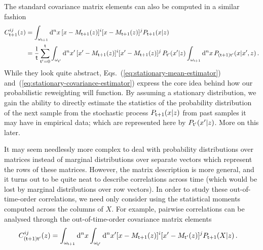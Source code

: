 The standard covariance matrix elements can also be computed in a similar fashion
\begin{align}
C^{ij}_{{\sf t}+1}(z) &= \int_{\omega_{{\sf t}+1}}{\rm d}^nx \,[x-M_{{\sf t}+1}(z)
]^i[x-M_{{\sf t}+1}(z)]^jP_{{\sf t}+1}(x\vert z) \nonumber \\
&= \frac{1}{{\sf t}}\sum_{{\sf t}'=0}^{{\sf t}}\int_{\omega_{{\sf t}'}}{\rm d}^nx' \, [x'-M_{{\sf t}+1}(z)]^i[x'-M_{{\sf t}+1}(z)]^j \,P_{{\sf t}'}(x'\vert z) \int_{\omega_{{\sf t}+1}}{\rm d}^nx \, P_{({\sf t}+1){\sf t}'}(x\vert x',z) \label{eq:stationary-covariance-estimator}\,.
\end{align}
While they look quite abstract, Eqs.~(\ref{eq:stationary-mean-estimator}) and~(\ref{eq:stationary-covariance-estimator}) express the core idea behind how our probabilistic reweighting will function. By assuming a stationary distribution, we gain the ability to directly estimate the statistics of the probability distribution of the next sample from the stochastic process $P_{{\sf t}+1}(x\vert z)$ from past samples it may have in empirical data; which are represented here by $P_{{\sf t}'}(x'\vert z)$. More on this later.

It may seem needlessly more complex to deal with probability distributions over matrices instead of marginal distributions over separate vectors which represent the rows of these matrices. However, the matrix description is more general, and it turns out to be quite neat to describe correlations across time (which would be lost by marginal distributions over row vectors). In order to study these out-of-time-order correlations, we need only consider using the statistical moments computed across the columns of $X$. For example, pairwise correlations can be analysed through the out-of-time-order covariance matrix elements
\begin{align}
C_{({\sf t}+1){\sf t}'}^{ij}(z) &= \int_{\omega_{{\sf t}+1}}{\rm d}^nx\int_{\omega_{{\sf t}'}}{\rm d}^nx' [x-M_{{\sf t}+1}(z)
]^i[x'-M_{{\sf t}'}(z)]^jP_{{\sf t}+1}(X\vert z) \label{eq:out-of-time-order-covariance-estimator} \,.
\end{align}

